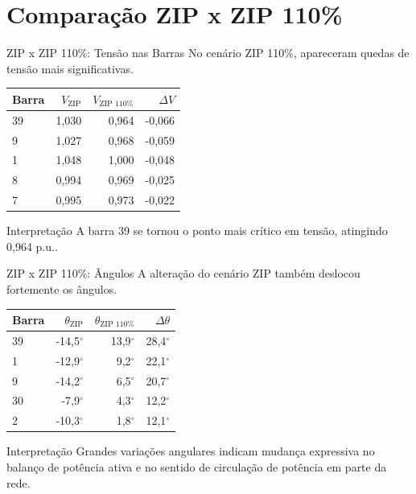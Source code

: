 \documentclass[aspectratio=169,11pt]{beamer}
\newcommand{\pu}{p.u.}
\begin{document}
\section{Comparação ZIP x ZIP 110\%}

\begin{frame}{ZIP x ZIP 110\%: Tensão nas Barras}
  No cenário ZIP 110\%, apareceram quedas de tensão mais significativas.

  \begin{table}
    \centering
    \small
    \begin{tabular}{lrrr}
      \toprule
      Barra & $V_{\text{ZIP}}$ & $V_{\text{ZIP 110\%}}$ & $\Delta V$ \\
      \midrule
      39 & 1,030 & 0,964 & -0,066 \\
      9 & 1,027 & 0,968 & -0,059 \\
      1 & 1,048 & 1,000 & -0,048 \\
      8 & 0,994 & 0,969 & -0,025 \\
      7 & 0,995 & 0,973 & -0,022 \\
      \bottomrule
    \end{tabular}
  \end{table}

  \begin{block}{Interpretação}
    A barra 39 se tornou o ponto mais crítico em tensão, atingindo 0,964 \pu.
  \end{block}
\end{frame}

\begin{frame}{ZIP x ZIP 110\%: Ângulos}
  A alteração do cenário ZIP também deslocou fortemente os ângulos.

  \begin{table}
    \centering
    \small
    \begin{tabular}{lrrr}
      \toprule
      Barra & $\theta_{\text{ZIP}}$ & $\theta_{\text{ZIP 110\%}}$ & $\Delta\theta$ \\
      \midrule
      39 & -14,5$^\circ$ & 13,9$^\circ$ & 28,4$^\circ$ \\
      1 & -12,9$^\circ$ & 9,2$^\circ$ & 22,1$^\circ$ \\
      9 & -14,2$^\circ$ & 6,5$^\circ$ & 20,7$^\circ$ \\
      30 & -7,9$^\circ$ & 4,3$^\circ$ & 12,2$^\circ$ \\
      2 & -10,3$^\circ$ & 1,8$^\circ$ & 12,1$^\circ$ \\
      \bottomrule
    \end{tabular}
  \end{table}

  \begin{block}{Interpretação}
    Grandes variações angulares indicam mudança expressiva no balanço de potência ativa e no sentido de circulação de potência em parte da rede.
  \end{block}
\end{frame}
\end{document}
